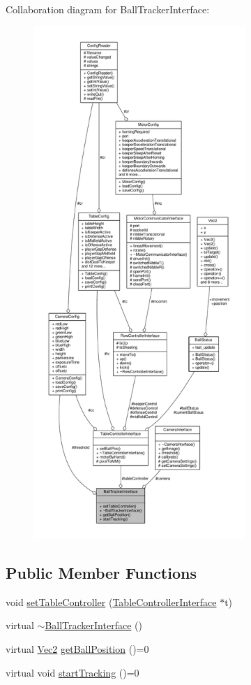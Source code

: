 Collaboration diagram for Ball\+Tracker\+Interface\+:\nopagebreak
\begin{figure}[H]
\begin{center}
\leavevmode
\includegraphics[height=550pt]{class_ball_tracker_interface__coll__graph}
\end{center}
\end{figure}
\subsection*{Public Member Functions}
\begin{DoxyCompactItemize}
\item 
void \hyperlink{class_ball_tracker_interface_a009a2a29aa7993a2405741daf707afbb}{set\+Table\+Controller} (\hyperlink{class_table_controller_interface}{Table\+Controller\+Interface} $\ast$t)
\item 
virtual \hyperlink{class_ball_tracker_interface_a85a4559b18c41e1a88da092ab8a7f42d}{$\sim$\+Ball\+Tracker\+Interface} ()
\item 
virtual \hyperlink{class_vec2}{Vec2} \hyperlink{class_ball_tracker_interface_a4a15d76099b49ef842a87dbabbac1b07}{get\+Ball\+Position} ()=0
\item 
virtual void \hyperlink{class_ball_tracker_interface_af140a5a17f082a74ff06bee64ef055ba}{start\+Tracking} ()=0
\end{DoxyCompactItemize}
